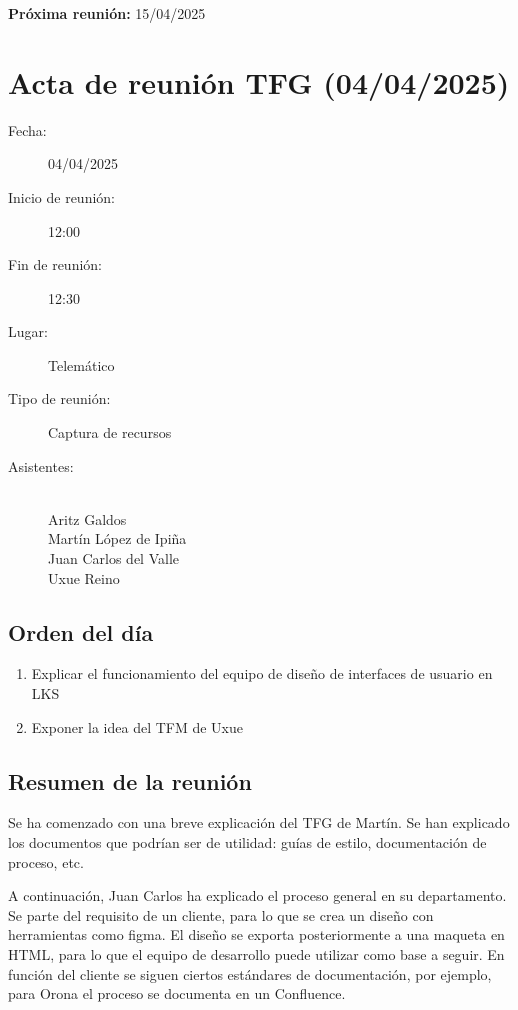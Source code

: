 \textbf{Próxima reunión:} 15/04/2025

\clearpage

\section{Acta de reunión TFG (04/04/2025)}
\label{anexo:acta_diseñadores}

\begin{description}
    \item[Fecha:] 04/04/2025
    \item[Inicio de reunión:] 12:00
    \item[Fin de reunión:] 12:30
    \item[Lugar:] Telemático
    \item[Tipo de reunión:] Captura de recursos
    \item[Asistentes:] ~\\
    Aritz Galdos\\
    Martín López de Ipiña\\
    Juan Carlos del Valle\\
    Uxue Reino
\end{description}

\subsection{Orden del día}
\begin{enumerate}
    \item Explicar el funcionamiento del equipo de diseño de interfaces de usuario en LKS
    \item Exponer la idea del TFM de Uxue
\end{enumerate}

\subsection{Resumen de la reunión}
Se ha comenzado con una breve explicación del TFG de Martín. Se han explicado los documentos que podrían ser de utilidad: guías de estilo, documentación de proceso, etc. 

A continuación, Juan Carlos ha explicado el proceso general en su departamento. Se parte del requisito de un cliente, para lo que se crea un diseño con herramientas como figma. El diseño se exporta posteriormente a una maqueta en HTML, para lo que el equipo de desarrollo puede utilizar como base a seguir. En función del cliente se siguen ciertos estándares de documentación, por ejemplo, para Orona el proceso se documenta en un Confluence.

